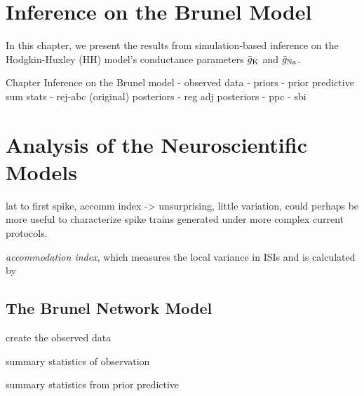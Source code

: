 \chapter{Inference on the Brunel Model}\label{chap:res_brunel}

In this chapter, we present the results from simulation-based inference on the Hodgkin-Huxley (HH) model's conductance parameters $\bar{g}_{\mathrm{K}}$ and $\bar{g}_{\mathrm{Na}}$. 


Chapter Inference on the Brunel model
- observed data 
- priors
- prior predictive sum stats 
- rej-abc (original) posteriors 
- reg adj posteriors
- ppc 
- sbi



\chapter{Analysis of the Neuroscientific Models}

lat to first spike, accomm index -> unsurprising, little variation, could perhaps be more useful to characterize spike trains generated under more complex current protocols. 




\textit{accommodation index}, which measures the local variance in ISIs and is calculated by






\section{The Brunel Network Model}

create the observed data

summary statistics of observation 

summary statistics from prior predictive

